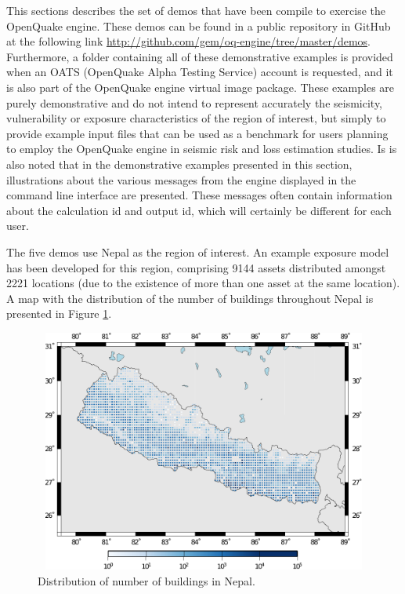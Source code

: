 This sections describes the set of demos that have been compile to exercise the OpenQuake engine. These demos can be found in a public repository in GitHub at the following link \href{http://github.com/gem/oq-engine/tree/master/demos}{http://github.com/gem/oq-engine/tree/master/demos}. Furthermore, a folder containing all of these demonstrative examples is provided when an OATS (OpenQuake Alpha Testing Service) account is requested, and it is also part of the OpenQuake engine virtual image package. These examples are purely demonstrative and do not intend to represent accurately the seismicity, vulnerability or exposure characteristics of the region of interest, but simply to provide example input files that can be used as a benchmark for users planning to employ the OpenQuake engine in seismic risk and loss estimation studies. Is is also noted that in the demonstrative examples presented in this section, illustrations about the various messages from the engine displayed in the command line interface are presented. These messages often contain information about the calculation id and output id, which will certainly be different for each user.

The five demos use Nepal as the region of interest. An example \gls{exposure model} has been developed for this region, comprising 9144 assets distributed amongst 2221 locations (due to the existence of more than one \gls{asset} at the same location). A map with the distribution of the number of buildings throughout Nepal is presented in Figure \ref{fig:expNepal}.

\begin{figure}[ht]
\centering
\includegraphics[width=12cm,height=8cm]{./figures/risk/NepalExposure.pdf}
\caption{Distribution of number of buildings in Nepal.}
\label{fig:expNepal}
\end{figure}

